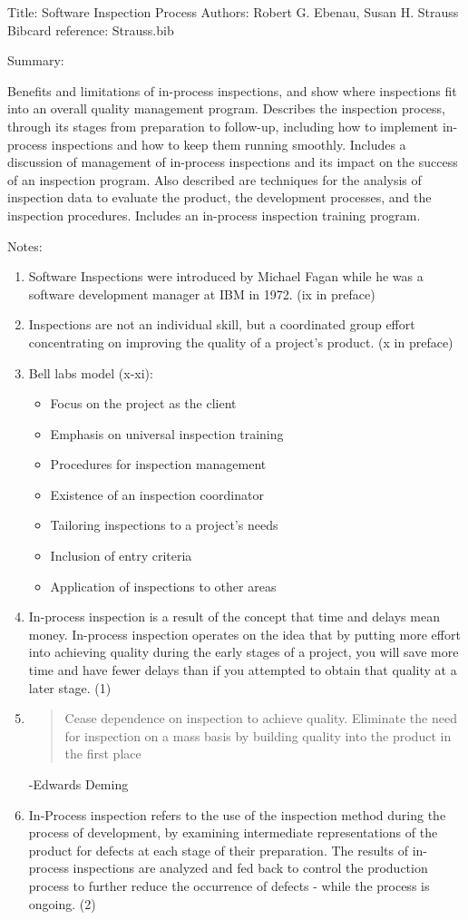 \documentclass{article}
\begin{document}
Title: Software Inspection Process
Authors: Robert G. Ebenau, Susan H. Strauss
Bibcard reference: Strauss.bib

Summary:

Benefits and limitations of in-process inspections, and show where
inspections fit into an overall quality management program.  Describes the
inspection process, through its stages from preparation to follow-up,
including how to implement in-process inspections and how to keep them
running smoothly.  Includes a discussion of management of in-process
inspections and its impact on the success of an inspection program.  Also
described are techniques for the analysis of inspection data to evaluate
the product, the development processes, and the inspection procedures.
Includes an in-process inspection training program.


Notes:
\begin{enumerate}
\item Software Inspections were introduced by Michael Fagan while he was a
software development manager at IBM in 1972. (ix in preface)
\item Inspections are not an individual skill, but a coordinated group
effort concentrating on improving the quality of a project's
product. (x in preface)
\item Bell labs model (x-xi): 
  \begin{itemize}
  \item Focus on the project as the client
  \item Emphasis on universal inspection training
  \item Procedures for inspection management
  \item Existence of an inspection coordinator
  \item Tailoring inspections to a project's needs
  \item Inclusion of entry criteria
  \item Application of inspections to other areas
  \end{itemize}
\item In-process inspection is a result of the concept that time and delays
mean money.  In-process inspection operates on the idea that by putting
more effort into achieving quality during the early stages of a project,
you will save more time and have fewer delays than if you attempted to
obtain that quality at a later stage. (1)
\item 
  \begin{quote}
    Cease dependence on inspection to achieve quality.  Eliminate the need
    for inspection on a mass basis by building quality into the product
    in the first place 
  \end{quote} -Edwards Deming
\item In-Process inspection refers to the use of the inspection method
during the process of development, by examining intermediate
representations of the product for defects at each stage of their
preparation. The results of in-process inspections are analyzed and fed
back to control the production process to further reduce the occurrence of
defects - while the process is ongoing. (2)

\end{enumerate}
\end{document}
